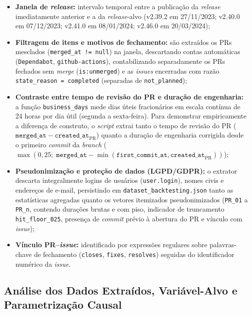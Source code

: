 \documentclass[12pt,openany,oneside,a4paper,english,brazilian,sumario=tradicional]{abntex2}
\begin{document}
\begin{itemize}
  \item \textbf{Janela de \textit{release}:} intervalo temporal entre a publicação da \textit{release} imediatamente anterior e a da \textit{release}-alvo (v2.39.2 em 27/11/2023; v2.40.0 em 07/12/2023; v2.41.0 em 08/01/2024; v2.46.0 em 20/03/2024);
  \item \textbf{Filtragem de itens e motivos de fechamento:} são extraídos os PRs mesclados (\texttt{merged\_at != null}) na janela, descartando contas automáticas (\texttt{Dependabot}, \texttt{github-actions}), contabilizando separadamente os PRs fechados sem \textit{merge} (\texttt{is:unmerged}) e as \textit{issues} encerradas com razão \texttt{state\_reason = completed} (separadas de \texttt{not\_planned});
  \item \textbf{Contraste entre tempo de revisão do PR e duração de engenharia:} a função \texttt{business\_days} mede dias úteis fracionários em escala contínua de 24 horas por dia útil (segunda a sexta-feira). Para demonstrar empiricamente a diferença de construto, o \textit{script} extrai tanto o tempo de revisão do PR ($\texttt{merged\_at} - \texttt{created\_at}_{\mathrm{PR}}$) quanto a duração de engenharia corrigida desde o primeiro \textit{commit} da \textit{branch} ($\max(0{,}25;\; \texttt{merged\_at} - \min(\texttt{first\_commit\_at}, \texttt{created\_at}_{\mathrm{PR}}))$);
  \item \textbf{Pseudonimização e proteção de dados (LGPD/GDPR):} o extrator descarta integralmente logins de usuários (\texttt{user.login}), nomes civis e endereços de e-mail, persistindo em \texttt{dataset\_backtesting.json} tanto as estatísticas agregadas quanto os vetores itemizados pseudonimizados (\texttt{PR\_01} a \texttt{PR\_n}, contendo durações brutas e com piso, indicador de truncamento \texttt{hit\_floor\_025}, presença de \textit{commit} prévio à abertura do PR e vínculo com \textit{issue});
  \item \textbf{Vínculo PR--\textit{issue}:} identificado por expressões regulares sobre palavras-chave de fechamento (\texttt{closes}, \texttt{fixes}, \texttt{resolves}) seguidas do identificador numérico da \textit{issue}.
\end{itemize}

\subsection{Análise dos Dados Extraídos, Variável-Alvo e Parametrização Causal}
\end{document}
